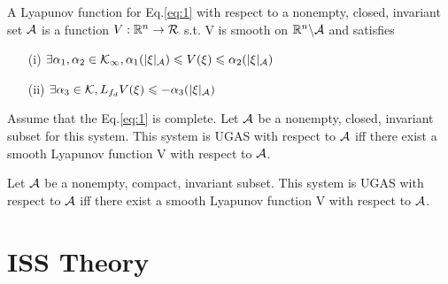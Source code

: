 \documentclass{paper}
\begin{document}
\begin{defi}
A Lyapunov function for Eq.\ref{eq:1} with respect to a nonempty, closed, invariant set $\mathcal{A}$ is a function ${V}:{\mathbb{R}^{n}}\rightarrow{\mathcal{R}}$ s.t. V is smooth on $\mathbb{R}^{n}\backslash\mathcal{A}$ and satisfies
\begin{enumerate}
\item[(i)] $\exists \alpha_1,\alpha_2\in\mathcal{K}_\infty,\alpha_1(|\xi|_{\mathcal{A}})\leqslant V(\xi)\leqslant\alpha_2(|\xi|_{\mathcal{A}})$
\item[(ii)] $\exists \alpha_3\in\mathcal{K}, L_{f_d}V(\xi)\leqslant-\alpha_3(|\xi|_{\mathcal{A}})$
\end{enumerate}
\end{defi}
\begin{thm}
Assume that the Eq.\ref{eq:1} is complete. Let $\mathcal{A}$ be a nonempty, closed, invariant subset for this system. This system 
is UGAS with respect to $\mathcal{A}$ iff there exist a smooth Lyapunov function V with respect to $\mathcal{A}$.
\end{thm}
\begin{thm}
Let $\mathcal{A}$ be a nonempty, compact, invariant subset. This system is UGAS with respect to $\mathcal{A}$ iff there exist a smooth 
Lyapunov function V with respect to $\mathcal{A}$.
\end{thm}
\section{ISS Theory}
\end{document}
